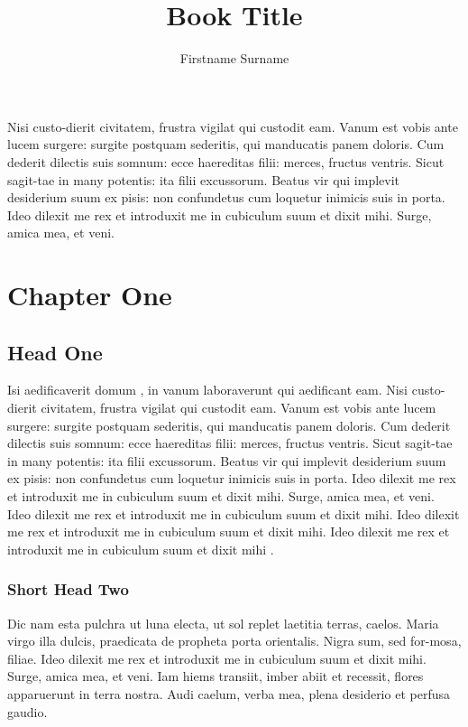 \documentclass{bln}
\title{Book Title}
\author{Firstname {\sc Surname}}
\begin{document}
\maketitle

\tableofcontents

\begin{preface}
Nisi custo-dierit civitatem, frustra vigilat qui custodit eam. Vanum
est vobis ante lucem surgere: surgite postquam sederitis, qui
manducatis panem doloris. Cum dederit dilectis suis somnum: ecce
haereditas filii: merces, fructus ventris. Sicut sagit-tae in many
potentis: ita filii excussorum. Beatus vir qui implevit desiderium
suum ex pisis: non confundetus cum loquetur inimicis suis in porta.
Ideo dilexit me rex et introduxit me in cubiculum suum et dixit mihi.
Surge, amica mea, et veni.
\end{preface}

\chapter{Chapter One}\label{chap1}

\section{Head One}\label{sec1}

Isi aedificaverit domum \cite{r1,r2}, in vanum
\cite{r3} laboraverunt qui aedificant eam.
Nisi custo-dierit civitatem, frustra vigilat qui custodit eam. Vanum
est vobis ante lucem surgere: surgite postquam sederitis, qui
manducatis panem doloris. Cum dederit dilectis suis somnum: ecce
haereditas filii: merces, fructus ventris. Sicut sagit-tae in many
potentis: ita filii excussorum. Beatus vir qui implevit desiderium
suum ex pisis: non confundetus cum loquetur inimicis suis in porta.
Ideo dilexit me rex et introduxit me in cubiculum suum et dixit mihi.
Surge, amica mea, et veni.
Ideo dilexit me rex et introduxit me in cubiculum suum et dixit mihi.
Ideo dilexit me rex et introduxit me in cubiculum suum et dixit mihi.
Ideo dilexit me rex et introduxit me in cubiculum suum et dixit mihi 
\cite{r4}.

\subsection{Short Head Two}

Dic nam esta pulchra ut luna electa, ut sol replet laetitia terras,
caelos. Maria virgo illa dulcis, praedicata de propheta porta
orientalis. Nigra sum, sed for-mosa, filiae. Ideo dilexit me rex et \cite{r1}
introduxit me in cubiculum suum et dixit mihi. Surge, amica mea, et
veni. Iam hiems transiit, imber abiit et recessit, flores apparuerunt in
terra nostra. Audi caelum, verba mea, plena desiderio et perfusa gaudio.
\end{document}
